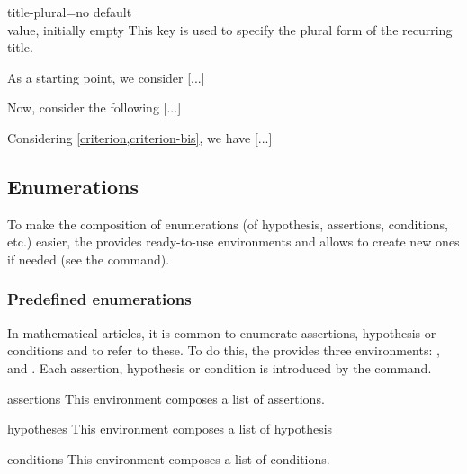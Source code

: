 \documentclass[english,nolocaltoc]{nwejmart}
\newtheorem[style=definition]{fact}
\newtheorem[title-plural=Criteria]{criterion}
\newtheorem[title=random experiment]{rexp}
\begin{document}
  \begin{docKey}{title-plural}{=}{no default\\value, initially empty}
    This key is used to specify the plural form of the recurring title.
  \end{docKey}
\begin{bodycode}[listing and text,listing options={deletekeywords={[2]label}}]
\begin{criterion}\label{criterion}
  As a starting point, we consider [...]
\end{criterion}
\begin{criterion}\label{criterion-bis}
  Now, consider the following [...]
\end{criterion}
Considering \vref{criterion,criterion-bis}, we have [...]
\end{bodycode}

\subsection{Enumerations}
\label{sec:list-dhyp-ou}

To make the composition of enumerations (of hypothesis, assertions,
conditions, etc.) easier, the  \nwejmauthorcl{} provides ready-to-use
environments and allows to create new ones if needed (see the 
 command).

\subsubsection{Predefined enumerations}
\label{sec:predefinies-:-listes}

In mathematical articles, it is common to enumerate assertions,
hypothesis or conditions and to refer to these. To do this, the
\nwejmauthorcl{} provides three environments: ,
 and . Each assertion,
hypothesis or condition is introduced by the  command.

\begin{docEnvironment}[doclang/environment content=assertions]{assertions}{}
  This environment composes a list of assertions.
\end{docEnvironment}
\begin{docEnvironment}[doclang/environment content=hypothesis]{hypotheses}{}
  This environment composes a list of hypothesis
\end{docEnvironment}
\begin{docEnvironment}[doc new=2019-03-18,doclang/environment content=conditions]{conditions}{}
  This environment composes a list of  conditions.
\end{docEnvironment}
\end{document}

